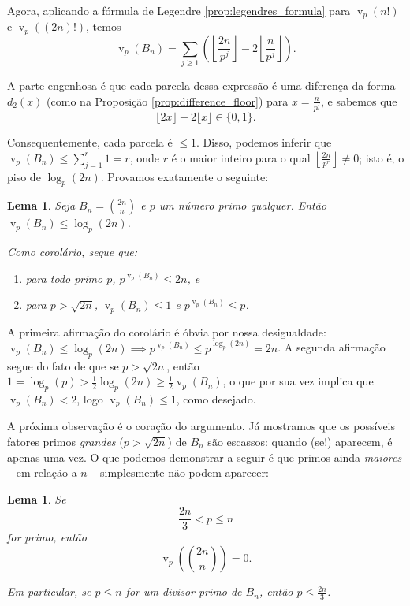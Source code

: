 \documentclass[11pt]{article}
\newtheorem{lemma}[theorem]{Lema}
\theoremstyle{remark}
\newcommand{\floor}[1]{\left\lfloor #1 \right\rfloor}
\newcommand{\vs}{\vspace{10px}}
\DeclareMathOperator{\val}{v}
\DeclareMathOperator{\vv}{v}
\begin{document}
Agora, aplicando a fórmula de Legendre \ref{prop:legendres_formula} para $\val_p(n!)$ e $\val_p((2n)!)$, temos
\[
\val_p(B_n)
=
\sum_{j\geq1}
\left(
\left\lfloor\frac{2n}{p^j}\right\rfloor
-
2\left\lfloor\frac{n}{p^j}\right\rfloor
\right).
\]


A parte engenhosa é que cada parcela dessa expressão é uma diferença da forma $d_2(x)$ (como na Proposição \ref{prop:difference_floor}) para $x=\frac{n}{p^j}$, e sabemos que
\[
\lfloor 2x\rfloor-2\lfloor x\rfloor\in\{0,1\}.
\]

Consequentemente, cada parcela é $\le 1$. Disso, podemos inferir que $\val_p(B_n)\le \sum\limits_{j=1}^r 1= r$, onde $r$ é o maior inteiro para o qual $\floor{\frac{2n}{p^r}}\ne 0$; isto é, o piso de $\log_p(2n)$. Provamos exatamente o seguinte:

\begin{lemma}\label{lemma:inequality_factors_bn}
    Seja $B_n = \binom{2n}{n}$ e $p$ um número primo qualquer. Então $\val_p(B_n)\le \log_p(2n)$.

    Como corolário, segue que:

    \begin{enumerate}
        \item para todo primo $p$, $p^{\vv_p(B_n)}\le 2n$, e
        \item para $p > \sqrt{2n}$, $\vv_p(B_n)\le 1$ e $p^{\vv_p(B_n)}\le p$.
    \end{enumerate}
\end{lemma}

A primeira afirmação do corolário é óbvia por nossa desigualdade: $\val_p(B_n)\le \log_p(2n)\implies p^{\vv_p(B_n)}\le p^{\log_p(2n)}= 2n$. A segunda afirmação segue do fato de que se $p>\sqrt{2n}$, então $1 = \log_p(p) >\frac{1}{2}\log_p(2n)\ge \frac{1}{2}\val_p(B_n)$, o que por sua vez implica que $\val_p(B_n)<2$, logo $\val_p(B_n)\le 1$, como desejado.
\vs

A próxima observação é o coração do argumento. Já mostramos que os possíveis fatores primos \textit{grandes} ($p>\sqrt{2n}$) de $B_n$ são escassos: quando (se!) aparecem, é apenas uma vez. O que podemos demonstrar a seguir é que primos ainda \textit{maiores} -- em relação a $n$ -- simplesmente não podem aparecer:

\begin{lemma} \label{lemma:threshold_no_primes_in_bn}
Se
\[
\frac{2n}{3}<p\leq n
\]
for primo, então
\[
\val_p\!\left(\binom{2n}{n}\right)=0.
\]

Em particular, se $p\le n$ for um divisor primo de $B_n$, então $p\le \frac{2n}3$. 
\end{lemma}
\end{document}
